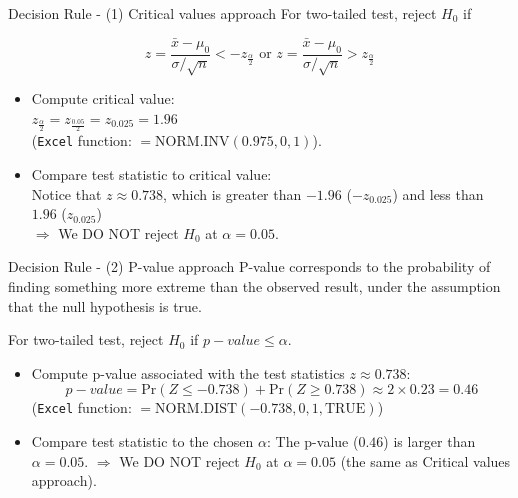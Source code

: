 \documentclass[
  10pt,
  ignorenonframetext,
]{beamer}
\providecommand{\tightlist}{%
  \setlength{\itemsep}{0pt}\setlength{\parskip}{0pt}}
\begin{document}
\begin{frame}[fragile]{Decision Rule - (1) Critical values approach}
\protect\hypertarget{decision-rule---1-critical-values-approach}{}
For two-tailed test, reject \(H_0\) if

\[
z = \frac{\bar{x}-\mu_0}{\sigma/\sqrt{n}} < -z_{\frac{\alpha}{2}} \text{ or } z = \frac{\bar{x}-\mu_0}{\sigma/\sqrt{n}} > z_{\frac{\alpha}{2}}
\]

\vspace{2mm}

\begin{itemize}
\tightlist
\item
  Compute critical value:\\
  \(z_{\frac{\alpha}{2}} = z_{\frac{0.05}{2}} = z_{0.025} = 1.96\)\\
  (\texttt{Excel} function: \(=\text{NORM.INV}(0.975,0,1)\)).
\end{itemize}

\vspace{2mm}

\begin{itemize}
\tightlist
\item
  Compare test statistic to critical value:\\
  Notice that \(z \approx 0.738\), which is greater than \(-1.96\)
  (\(-z_{0.025}\)) and less than \(1.96\) (\(z_{0.025}\))\\
  \(\Rightarrow\) We DO NOT reject \(H_0\) at \(\alpha = 0.05\).
\end{itemize}
\end{frame}

\begin{frame}[fragile]{Decision Rule - (2) P-value approach}
\protect\hypertarget{decision-rule---2-p-value-approach}{}
P-value corresponds to the probability of finding something more extreme
than the observed result, under the assumption that the null hypothesis
is true.

\vspace{2mm}

For two-tailed test, reject \(H_0\) if \(p-value \leq \alpha\).

\vspace{2mm}

\begin{itemize}
\item
  Compute p-value associated with the test statistics
  \(z \approx 0.738\): \[
  p-value = \text{Pr}(Z \leq -0.738) + \text{Pr}(Z \geq 0.738) \approx 2\times 0.23 = 0.46
  \] (\texttt{Excel} function:
  \(=\text{NORM.DIST}(-0.738,0,1,\text{TRUE})\))
\item
  Compare test statistic to the chosen \(\alpha\): The p-value
  (\(0.46\)) is larger than \(\alpha = 0.05\). \(\Rightarrow\) We DO NOT
  reject \(H_0\) at \(\alpha = 0.05\) (the same as Critical values
  approach).
\end{itemize}
\end{frame}
\end{document}
